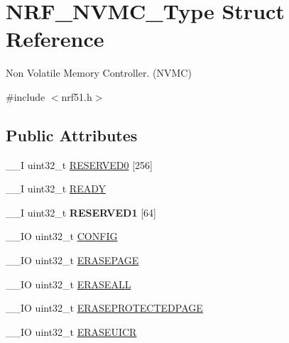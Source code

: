 \hypertarget{struct_n_r_f___n_v_m_c___type}{}\section{N\+R\+F\+\_\+\+N\+V\+M\+C\+\_\+\+Type Struct Reference}
\label{struct_n_r_f___n_v_m_c___type}


Non Volatile Memory Controller. (N\+V\+M\+C)  




{\ttfamily \#include $<$nrf51.\+h$>$}

\subsection*{Public Attributes}
\begin{DoxyCompactItemize}
\item 
\+\_\+\+\_\+\+I uint32\+\_\+t \hyperlink{struct_n_r_f___n_v_m_c___type_a61687977279bb28a1ec77b69d090d343}{R\+E\+S\+E\+R\+V\+E\+D0} \mbox{[}256\mbox{]}
\item 
\+\_\+\+\_\+\+I uint32\+\_\+t \hyperlink{struct_n_r_f___n_v_m_c___type_a4bcb016f1e674c99a00d6cd406338f00}{R\+E\+A\+D\+Y}
\item 
\hypertarget{struct_n_r_f___n_v_m_c___type_aa5a306a2e26038e23059a505acb2db7b}{}\+\_\+\+\_\+\+I uint32\+\_\+t {\bfseries R\+E\+S\+E\+R\+V\+E\+D1} \mbox{[}64\mbox{]}\label{struct_n_r_f___n_v_m_c___type_aa5a306a2e26038e23059a505acb2db7b}

\item 
\+\_\+\+\_\+\+I\+O uint32\+\_\+t \hyperlink{struct_n_r_f___n_v_m_c___type_a10b37fa61477a3820d0642ede5b1f201}{C\+O\+N\+F\+I\+G}
\item 
\+\_\+\+\_\+\+I\+O uint32\+\_\+t \hyperlink{struct_n_r_f___n_v_m_c___type_ae1fbb36b029d81f294ee1781be7a6617}{E\+R\+A\+S\+E\+P\+A\+G\+E}
\item 
\+\_\+\+\_\+\+I\+O uint32\+\_\+t \hyperlink{struct_n_r_f___n_v_m_c___type_ace6e7ded135f8fdbb429f8b92e7abdc3}{E\+R\+A\+S\+E\+A\+L\+L}
\item 
\+\_\+\+\_\+\+I\+O uint32\+\_\+t \hyperlink{struct_n_r_f___n_v_m_c___type_aba164fc724a0350325ac6234b18660e4}{E\+R\+A\+S\+E\+P\+R\+O\+T\+E\+C\+T\+E\+D\+P\+A\+G\+E}
\item 
\+\_\+\+\_\+\+I\+O uint32\+\_\+t \hyperlink{struct_n_r_f___n_v_m_c___type_ac30e5500fbf650ccfd3378c4d59a0bc5}{E\+R\+A\+S\+E\+U\+I\+C\+R}
\end{DoxyCompactItemize}



